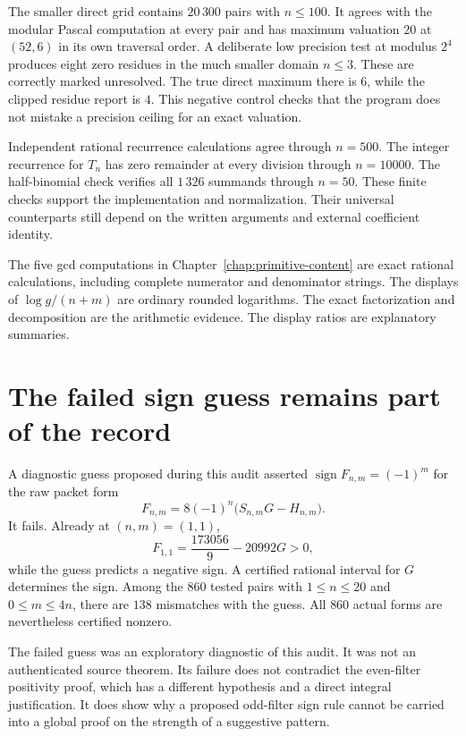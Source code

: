 The smaller direct grid contains $20\,300$ pairs with $n\leq100$. It agrees with the modular Pascal computation at every pair and has maximum valuation $20$ at $(52,6)$ in its own traversal order. A deliberate low precision test at modulus $2^4$ produces eight zero residues in the much smaller domain $n\leq3$. These are correctly marked unresolved. The true direct maximum there is $6$, while the clipped residue report is $4$. This negative control checks that the program does not mistake a precision ceiling for an exact valuation.

Independent rational recurrence calculations agree through $n=500$. The integer recurrence for $T_n$ has zero remainder at every division through $n=10000$. The half-binomial check verifies all $1\,326$ summands through $n=50$. These finite checks support the implementation and normalization. Their universal counterparts still depend on the written arguments and external coefficient identity.

The five gcd computations in Chapter~\ref{chap:primitive-content} are exact rational calculations, including complete numerator and denominator strings. The displays of $\log g/(n+m)$ are ordinary rounded logarithms. The exact factorization and decomposition are the arithmetic evidence. The display ratios are explanatory summaries.

\section{The failed sign guess remains part of the record}

A diagnostic guess proposed during this audit asserted $\operatorname{sign}F_{n,m}=(-1)^m$ for the raw packet form
\begin{equation}
 F_{n,m}=8(-1)^n\bigl(S_{n,m}G-H_{n,m}\bigr).
 \label{eq:status-raw-F}
\end{equation}
It fails. Already at $(n,m)=(1,1)$,
\begin{equation}
 F_{1,1}=\frac{173056}{9}-20992G>0,
 \label{eq:status-sign-counterexample}
\end{equation}
while the guess predicts a negative sign. A certified rational interval for $G$ determines the sign. Among the $860$ tested pairs with $1\leq n\leq20$ and $0\leq m\leq4n$, there are $138$ mismatches with the guess. All $860$ actual forms are nevertheless certified nonzero.

The failed guess was an exploratory diagnostic of this audit. It was not an authenticated source theorem. Its failure does not contradict the even-filter positivity proof, which has a different hypothesis and a direct integral justification. It does show why a proposed odd-filter sign rule cannot be carried into a global proof on the strength of a suggestive pattern.

